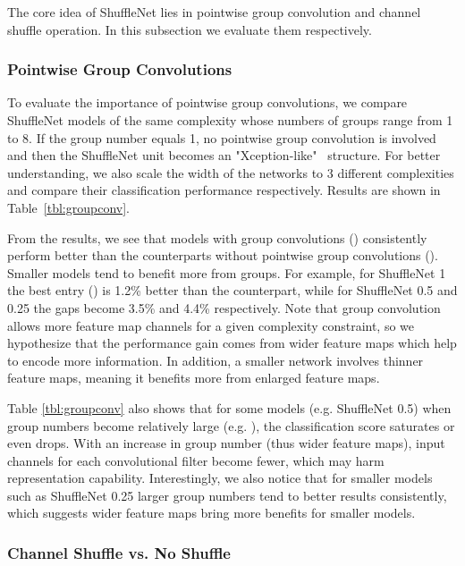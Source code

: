 \documentclass[10pt,twocolumn,letterpaper]{article}
\begin{document}
The core idea of ShuffleNet lies in pointwise group convolution and channel shuffle operation. In this subsection we evaluate them respectively.

\subsubsection{Pointwise Group Convolutions}
\label{sec:gconv}

To evaluate the importance of pointwise group convolutions, we compare ShuffleNet models of the same complexity whose numbers of groups range from 1 to 8. If the group number equals 1, no pointwise group convolution is involved and then the ShuffleNet unit becomes an "Xception-like"~\cite{chollet2016xception} structure. For better understanding, we also scale the width of the networks to 3 different complexities and compare their classification performance respectively. Results are shown in Table~\ref{tbl:groupconv}.

From the results, we see that models with group convolutions () consistently perform better than the counterparts without pointwise group convolutions (). Smaller models tend to benefit more from groups. For example, for ShuffleNet 1 the best entry () is 1.2\% better than the counterpart, while for ShuffleNet 0.5 and 0.25 the gaps become 3.5\% and 4.4\% respectively. Note that group convolution allows more feature map channels for a given complexity constraint, so we hypothesize that the performance gain comes from wider feature maps which help to encode more information. In addition, a smaller network involves thinner feature maps, meaning it benefits more from enlarged feature maps.

Table \ref{tbl:groupconv} also shows that for some models (e.g. ShuffleNet 0.5) when group numbers become relatively large (e.g. ), the classification score saturates or even drops. With an increase in group number (thus wider feature maps), input channels for each convolutional filter become fewer, which may harm representation capability. Interestingly, we also notice that for smaller models such as ShuffleNet 0.25 larger group numbers tend to better results consistently, which suggests wider feature maps bring more benefits for smaller models. 

\subsubsection{Channel Shuffle vs. No Shuffle}
\label{sec:shuffle}
\end{document}
